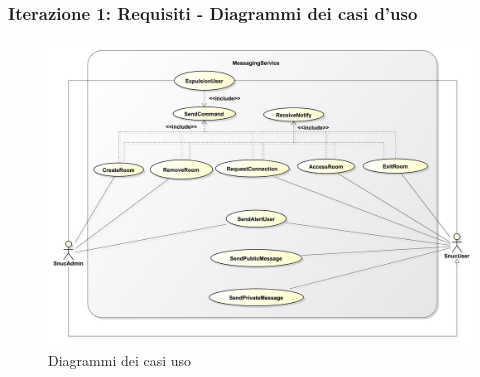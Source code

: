 \documentclass[t]{beamer} %
\begin{document}
\begin{frame}
  \frametitle{Iterazione 1: Requisiti - Diagrammi dei casi d'uso}
   \begin{figure}[h]
    \includegraphics[scale=0.145]{image_astah/UseCaseDiagram.png}{\centering}
    \caption{Diagrammi dei casi uso} 
    \label{fig_UCD}
   \end{figure}
\end{frame}
\end{document}
